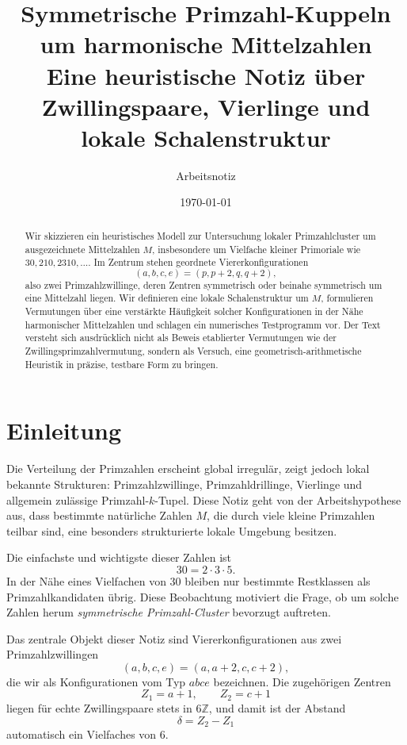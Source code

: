 \documentclass[11pt,a4paper]{article}
\title{Symmetrische Primzahl-Kuppeln um harmonische Mittelzahlen\\
	\large Eine heuristische Notiz über Zwillingspaare, Vierlinge und lokale Schalenstruktur}
\author{Arbeitsnotiz}
\date{\today}
\theoremstyle{definition}
\theoremstyle{plain}
\theoremstyle{remark}
\newcommand{\Z}{\mathbb{Z}}
\begin{document}
	
	\maketitle
	
	\begin{abstract}
		Wir skizzieren ein heuristisches Modell zur Untersuchung lokaler Primzahlcluster um ausgezeichnete Mittelzahlen $M$, insbesondere um Vielfache kleiner Primoriale wie $30,210,2310,\dots$. Im Zentrum stehen geordnete Viererkonfigurationen
		\[
		(a,b,c,e)=(p,p+2,q,q+2),
		\]
		also zwei Primzahlzwillinge, deren Zentren symmetrisch oder beinahe symmetrisch um eine Mittelzahl liegen. 
		Wir definieren eine lokale Schalenstruktur um $M$, formulieren Vermutungen über eine verstärkte Häufigkeit solcher Konfigurationen in der Nähe harmonischer Mittelzahlen und schlagen ein numerisches Testprogramm vor. 
		Der Text versteht sich ausdrücklich nicht als Beweis etablierter Vermutungen wie der Zwillingsprimzahlvermutung, sondern als Versuch, eine geometrisch-arithmetische Heuristik in präzise, testbare Form zu bringen.
	\end{abstract}
	
	\section{Einleitung}
	
	Die Verteilung der Primzahlen erscheint global irregulär, zeigt jedoch lokal bekannte Strukturen: Primzahlzwillinge, Primzahldrillinge, Vierlinge und allgemein zulässige Primzahl-$k$-Tupel. 
	Diese Notiz geht von der Arbeitshypothese aus, dass bestimmte natürliche Zahlen $M$, die durch viele kleine Primzahlen teilbar sind, eine besonders strukturierte lokale Umgebung besitzen. 
	
	Die einfachste und wichtigste dieser Zahlen ist
	\[
	30=2\cdot 3\cdot 5.
	\]
	In der Nähe eines Vielfachen von $30$ bleiben nur bestimmte Restklassen als Primzahlkandidaten übrig. 
	Diese Beobachtung motiviert die Frage, ob um solche Zahlen herum \emph{symmetrische Primzahl-Cluster} bevorzugt auftreten.
	
	Das zentrale Objekt dieser Notiz sind Viererkonfigurationen aus zwei Primzahlzwillingen
	\[
	(a,b,c,e)=(a,a+2,c,c+2),
	\]
	die wir als Konfigurationen vom Typ $abce$ bezeichnen. 
	Die zugehörigen Zentren
	\[
	Z_1=a+1,\qquad Z_2=c+1
	\]
	liegen für echte Zwillingspaare stets in $6\Z$, und damit ist der Abstand
	\[
	\delta=Z_2-Z_1
	\]
	automatisch ein Vielfaches von $6$.
	
\end{document}
